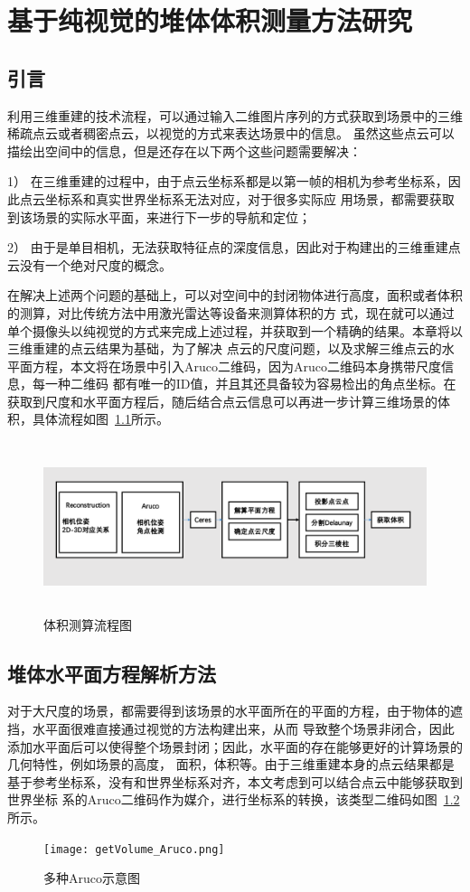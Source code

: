 \chapter{基于纯视觉的堆体体积测量方法研究}
\label{cha:chap4}
\section{引言}
\label{sec:4.1}
利用三维重建的技术流程，可以通过输入二维图片序列的方式获取到场景中的三维稀疏点云或者稠密点云，以视觉的方式来表达场景中的信息。
虽然这些点云可以描绘出空间中的信息，但是还存在以下两个这些问题需要解决：

1）	在三维重建的过程中，由于点云坐标系都是以第一帧的相机为参考坐标系，因此点云坐标系和真实世界坐标系无法对应，对于很多实际应
用场景，都需要获取到该场景的实际水平面，来进行下一步的导航和定位；

2）	由于是单目相机，无法获取特征点的深度信息，因此对于构建出的三维重建点云没有一个绝对尺度的概念。

在解决上述两个问题的基础上，可以对空间中的封闭物体进行高度，面积或者体积的测算，对比传统方法中用激光雷达等设备来测算体积的方
式，现在就可以通过单个摄像头以纯视觉的方式来完成上述过程，并获取到一个精确的结果。本章将以三维重建的点云结果为基础，为了解决
点云的尺度问题，以及求解三维点云的水平面方程，本文将在场景中引入Aruco二维码，因为Aruco二维码本身携带尺度信息，每一种二维码
都有唯一的ID值，并且其还具备较为容易检出的角点坐标。在获取到尺度和水平面方程后，随后结合点云信息可以再进一步计算三维场景的体
积，具体流程如图~\ref{fig:getVolume}所示。

\begin{figure}[H] %
    \centering
    \includegraphics[height=5cm]{getVolume.png}
    \caption{体积测算流程图}
    \label{fig:getVolume}
  \end{figure}

\section{堆体水平面方程解析方法}
\label{sec:4.2}
对于大尺度的场景，都需要得到该场景的水平面所在的平面的方程，由于物体的遮挡，水平面很难直接通过视觉的方法构建出来，从而
导致整个场景非闭合，因此添加水平面后可以使得整个场景封闭；因此，水平面的存在能够更好的计算场景的几何特性，例如场景的高度，
面积，体积等。由于三维重建本身的点云结果都是基于参考坐标系，没有和世界坐标系对齐，本文考虑到可以结合点云中能够获取到世界坐标
系的Aruco二维码作为媒介，进行坐标系的转换，该类型二维码如图~\ref{fig:getVolume_Aruco}所示。
\begin{figure}[H] %
  \centering
  \texttt{[image: getVolume\_Aruco.png]}
  \caption{多种Aruco示意图}
  \label{fig:getVolume_Aruco}
  \end{figure}
